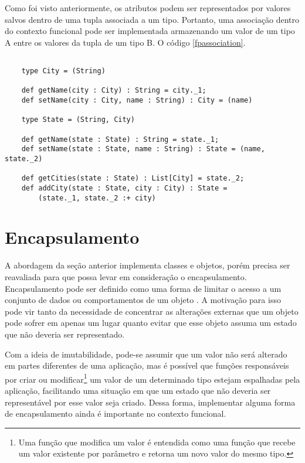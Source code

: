 Como foi visto anteriormente, os atributos 
podem ser representados por valores salvos 
dentro de uma tupla associada a um tipo. 
Portanto, uma associação dentro do contexto 
funcional pode ser implementada armazenando 
um valor de um tipo A entre os valores da tupla 
de um tipo B. O código \ref{fpassociation}.

\begin{lstlisting}[caption={Exemplo de associação no contexto funcional},label=fpassociation]
    
    type City = (String)
    
    def getName(city : City) : String = city._1;
    def setName(city : City, name : String) : City = (name)

    type State = (String, City)
    
    def getName(state : State) : String = state._1;
    def setName(state : State, name : String) : State = (name, state._2)
    
    def getCities(state : State) : List[City] = state._2;
    def addCity(state : State, city : City) : State =
        (state._1, state._2 :+ city)

\end{lstlisting}

\section{Encapsulamento}

A abordagem da seção anterior implementa 
classes e objetos, porém precisa ser 
reavaliada para que possa levar em consideração 
o encapsulamento. Encapsulamento pode ser definido 
como uma forma de limitar o acesso a um conjunto 
de dados ou comportamentos de um objeto \cite{quarkoo}. 
A motivação para isso pode vir tanto da necessidade 
de concentrar as alterações externas que um objeto 
pode sofrer em apenas um lugar quanto evitar que 
esse objeto assuma um estado que não deveria ser 
representado. 

Com a ideia de imutabilidade, pode-se 
assumir que um valor não será alterado em partes 
diferentes de uma aplicação, mas é possível 
que funções responsáveis por criar ou modificar\footnote{
    Uma função que modifica um valor é entendida 
    como uma função que recebe um valor existente 
    por parâmetro e retorna um novo valor do mesmo 
    tipo.
} 
um valor de um determinado tipo estejam 
espalhadas pela aplicação, facilitando uma 
situação em que um estado que não deveria ser 
representável por esse valor seja criado. 
Dessa forma, implementar alguma forma de 
encapsulamento ainda é importante no 
contexto funcional.

